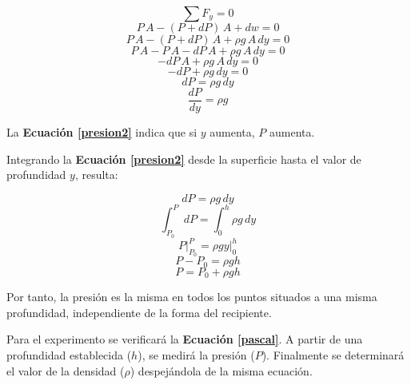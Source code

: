 \documentclass[letter,11pt]{article}
\begin{document}
\begin{equation*}
    \sum F_y = 0
\end{equation*}
\begin{equation*}
    P\,A - (P + dP)\,A + dw = 0
\end{equation*}
\begin{equation*}
    P\,A - (P + dP)\,A + \rho g\,A\,dy = 0
\end{equation*}
\begin{equation*}
    P\,A - P\,A - dP\,A + \rho g\,A\,dy = 0
\end{equation*}
\begin{equation*}
    - dP\,A + \rho g\,A\,dy = 0
\end{equation*}
\begin{equation*}
    - dP + \rho g\,dy = 0
\end{equation*}
\begin{equation*}
    dP = \rho g\,dy
\end{equation*}
\begin{equation}
    \frac{dP}{dy} = \rho g
\label{presion2}
\end{equation}
\vspace{0.10cm}

La \textbf{Ecuación \ref{presion2}} indica que si $y$ aumenta, $P$ aumenta.

Integrando la \textbf{Ecuación \ref{presion2}} desde la superficie hasta
el valor de profundidad $y$, resulta:

\begin{equation*}
    dP = \rho g\,dy
\end{equation*}
\begin{equation*}
    \int_{P_0}^{P} dP = \int_{0}^{h} \rho g\,dy
\end{equation*}
\begin{equation*}
    P\Biggr|_{P_0}^{P} = \rho g y\Biggr|_{0}^{h}
\end{equation*}
\begin{equation*}
    P - P_0 = \rho g h
\end{equation*}
\begin{equation}
    P = P_0 + \rho g h
\label{pascal}
\end{equation}
\vspace{0.10cm}

Por tanto, la presión es la misma en todos los puntos situados a una misma
profundidad, independiente de la forma del recipiente.

Para el experimento se verificará la \textbf{Ecuación \ref{pascal}}. A partir de
una profundidad establecida ($h$), se medirá la presión ($P$). Finalmente se
determinará el valor de la densidad ($\rho$) despejándola de la misma ecuación.
\end{document}
